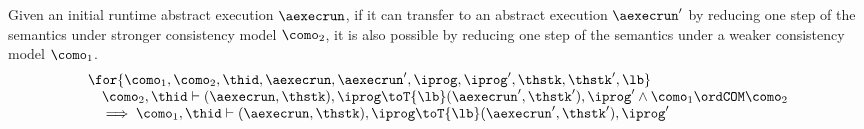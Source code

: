 \begin{lem}
\label{lem:semantics-monotonicity}
Given an initial runtime abstract execution \( \aexecrun \), if it can transfer to an abstract execution \( \aexecrun' \) by reducing one step of the semantics under stronger consistency model \( \como_{2}\), it is also possible by reducing one step of the semantics under a weaker consistency model \( \como_{1} \).
\[
\begin{array}{@{}l@{}}
    \for{\como_{1}, \como_{2}, \thid, \aexecrun, \aexecrun', \iprog, \iprog', \thstk, \thstk', \lb}  \\
    \quad \como_{2}, \thid \vdash ( \aexecrun, \thstk ), \iprog \toT{\lb} ( \aexecrun', \thstk' ), \iprog'
    \land \como_{1} \ordCOM \como_{2} \\
    \quad \implies \como_{1}, \thid \vdash ( \aexecrun, \thstk ), \iprog \toT{\lb} ( \aexecrun', \thstk' ), \iprog'
\end{array}
\]
\end{lem}
